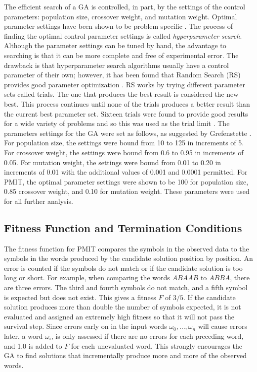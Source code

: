 \documentclass{llncs}
\begin{document}
	The efficient search of a GA is controlled, in part, by the settings of the control parameters: population size, crossover weight, and mutation weight. Optimal parameter settings have been shown to be problem specific \cite{hyperparameter}. The process of finding the optimal control parameter settings is called \textit{hyperparameter search}. Although the parameter settings can be tuned by hand, the advantage to searching is that it can be more complete and free of experimental error. The drawback is that hyperparameter search algorithms usually have a control parameter of their own; however, it has been found that Random Search (RS) provides good parameter optimization \cite{hyperparameter}. RS works by trying different parameter sets called trials. The one that produces the best result is considered the new best. This process continues until none of the trials produces a better result than the current best parameter set. Sixteen trials were found to provide good results for a wide variety of problems and so this was used as the trial limit \cite{hyperparameter}. The parameters settings for the GA were set as follows, as suggested by Grefenstette \cite{grefenstette_optimalGAparameter}. For population size, the settings were bound from 10 to 125 in increments of 5. For crossover weight, the settings were bound from 0.6 to 0.95 in increments of 0.05. For mutation weight, the settings were bound from 0.01 to 0.20 in increments of 0.01 with the additional values of 0.001 and 0.0001 permitted. For PMIT, the optimal parameter settings were shown to be 100 for population size, 0.85 crossover weight, and 0.10 for mutation weight. These parameters were used for all further analysis.
	
	\subsection{Fitness Function and Termination Conditions}
	
	The fitness function for PMIT compares the symbols in the observed data to the symbols in the words produced by the candidate solution position by position. An error is counted if the symbols do not match or if the candidate solution is too long or short. For example, when comparing the words $ABAAB$ to $ABBA$, there are three errors. The third and fourth symbols do not match, and a fifth symbol is expected but does not exist. This gives a fitness $F$ of $3 / 5$. If the candidate solution produces more than double the number of symbols expected, it is not evaluated and assigned an extremely high fitness so that it will not pass the survival step. Since errors early on in the input words $\omega_{0}, \ldots ,\omega_{n}$ will cause errors later, a word $\omega_{i}$, is only assessed if there are no errors for each preceding word, and 1.0 is added to $F$ for each unevaluated word. This strongly encourages the GA to find solutions that incrementally produce more and more of the observed words.
	
\end{document}
